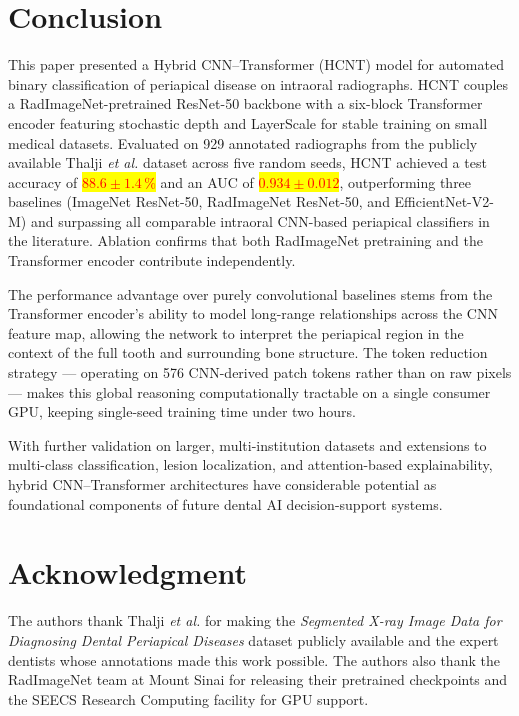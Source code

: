 \documentclass[conference]{IEEEtran}
\newcommand{\HCNT}{\textsc{HCNT}\xspace}
\newcommand{\etal}{\textit{et al.}\xspace}
\newcommand{\RESULT}[1]{\colorbox{yellow}{\textcolor{red}{\textbf{#1}}}}
\begin{document}
\section{Conclusion}
\label{sec:conclusion}

This paper presented a Hybrid CNN--Transformer (\HCNT) model for automated
binary classification of periapical disease on intraoral radiographs. \HCNT
couples a RadImageNet-pretrained ResNet-50 backbone with a six-block
Transformer encoder featuring stochastic depth and LayerScale for stable
training on small medical datasets. Evaluated on 929 annotated radiographs
from the publicly available Thalji \etal dataset \cite{thalji2024} across
five random seeds, \HCNT achieved a test accuracy of \RESULT{$88.6\pm1.4\,\%$} and an
AUC of \RESULT{$0.934\pm0.012$}, outperforming three baselines (ImageNet ResNet-50,
RadImageNet ResNet-50, and EfficientNet-V2-M) and surpassing all comparable
intraoral CNN-based periapical classifiers in the literature. Ablation
confirms that both RadImageNet pretraining and the Transformer encoder
contribute independently.

The performance advantage over purely convolutional baselines stems from
the Transformer encoder's ability to model long-range relationships across
the CNN feature map, allowing the network to interpret the periapical
region in the context of the full tooth and surrounding bone structure. The
token reduction strategy --- operating on 576 CNN-derived patch tokens
rather than on raw pixels --- makes this global reasoning computationally
tractable on a single consumer GPU, keeping single-seed training time under
two hours.

With further validation on larger, multi-institution datasets and
extensions to multi-class classification, lesion localization, and
attention-based explainability, hybrid CNN--Transformer architectures have
considerable potential as foundational components of future dental AI
decision-support systems.

\section*{Acknowledgment}

The authors thank Thalji \etal for making the \emph{Segmented X-ray Image
Data for Diagnosing Dental Periapical Diseases} dataset publicly available
\cite{thalji2024} and the expert dentists whose annotations made this work
possible. The authors also thank the RadImageNet team at Mount Sinai for
releasing their pretrained checkpoints \cite{mei2022radimagenet} and the
SEECS Research Computing facility for GPU support.
\end{document}
